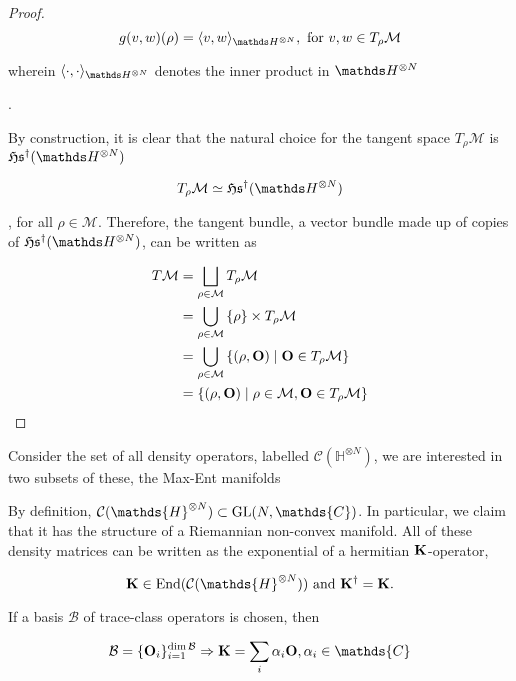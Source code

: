 \documentclass{homework}
\begin{document}
\begin{proof}
{$$
    g(v, w) (\rho) = \langle v, w \rangle_{\hilbert^{\otimes N}}, \textnormal{ for } v, w \in T_{\rho} \mathcal{M}
$$

wherein $\langle \cdot, \cdot \rangle_{\hilbert^{\otimes N}}$ denotes the inner product in $\hilbert^{\otimes N}$
}. 

By construction, it is clear that the natural choice for the 
tangent space $T_\rho \mathcal{M}$ is $\mathfrak{H}\mathfrak{s}^{\dagger}(\hilbert^{\otimes N})$

$$
    T_\rho \mathcal{M} \simeq \mathfrak{H}\mathfrak{s}^{\dagger}(\hilbert^{\otimes N})
$$

, for all $\rho \in \mathcal{M}$. Therefore, the tangent bundle, a vector bundle made up of copies of $\mathfrak{H}\mathfrak{s}^{\dagger}(\hilbert^{\otimes N})$, can be written as 

$$
    {\displaystyle {\begin{aligned}T\mathcal{M}&=\bigsqcup _{\rho \in \mathcal{M}}T_{\rho}\mathcal{M}\\&=\bigcup _{\rho\in \mathcal{M}}\left\{\rho\right\}\times T_{\rho}\mathcal{M}\\&=\bigcup_{\rho\in \mathcal{M}}\left\{(\rho,{\bf O})\mid {\bf O}\in T_{\rho} \mathcal{M}\right\}\\&=\left\{(\rho,{\bf O})\mid \rho\in \mathcal{M},{\bf O}\in T_{\rho} \mathcal{M}\right\}\end{aligned}}}
$$

\end{proof}


\clearpage

Consider the set of all density operators, labelled $\mathcal{C}(\mathds{H}^{\otimes N})$, we are interested in two subsets of these, the Max-Ent manifolds




By definition, $\mathcal{C}(\mathds{H}^{\otimes N}) \subset \textnormal{GL}(N, \mathds{C})$. In particular, we claim that it has the structure of a Riemannian non-convex manifold. All of these density matrices can be written as the exponential of a hermitian ${\bf K}$-operator,

$$
    {\bf K} \in \textnormal{End}(\mathcal{C}(\mathds{H}^{\otimes N})) \textnormal{  and  } {\bf K}^\dagger = {\bf K}.
$$

If a basis $\mathcal{B}$ of trace-class operators is chosen, then

$$
    \mathcal{B} = \{{\bf O}_i\}_{i=1}^{\dim \mathcal{B}} \Rightarrow {\bf K} = \sum_{i} \alpha_i {\bf O}, \alpha_i \in \mathds{C}
 $$
 
\end{document}

